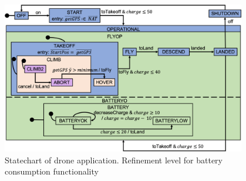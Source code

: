 \begin{figure}[!h]
	\centering
	\includegraphics[width=0.95\textwidth]{figures/Picture4.png}
	\caption{Statechart of drone application. Refinement level for battery consumption functionality}
	\label{fig:drone4}
\end{figure} 
